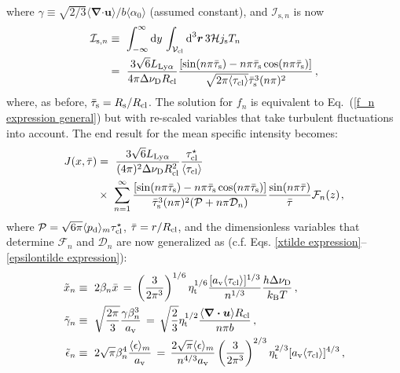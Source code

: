 \documentclass[fleqn,usenatbib]{mnras}
\newcommand{\taucl}{\tau_{\rm cl}}
\begin{document}
where $\gamma \equiv \sqrt{2/3} \langle \boldsymbol{\nabla} \boldsymbol{\cdot} \boldsymbol{u} \rangle/b\langle \alpha_0 \rangle$  (assumed constant), and $\mathcal{I}_{\textrm{s},n}$ is now
\begin{align}
    \mathcal{I}_{\textrm{s}, n} &\equiv~ \int_{-\infty}^{\infty} \textrm{d}y \, \int_{\mathcal{V}_{\rm cl}} \textrm{d}^3 \boldsymbol{r} \, 3 \mathcal{H} j_{\rm s} T_n \nonumber \\
    &=~ \dfrac{3\sqrt{6} L_{\rm Ly\alpha} }{4 \pi \Delta \nu_{\rm D} R_{\rm cl}} \dfrac{[\sin(n\pi \Bar{\tau}_{\rm s}) - n\pi \Bar{\tau}_{\rm s} \cos( n\pi \Bar{\tau}_{\rm s})]}{ \sqrt{2 \pi \langle \taucl \rangle} \Bar{\tau}_{\rm s}^3 (n \pi)^2} \, ,
\end{align}
where, as before, $\Bar{\tau}_{\rm s} = R_{\rm s}/R_{\rm cl}$. The solution for $f_n$ is equivalent to Eq.~(\ref{f_n expression general}) but with re-scaled variables that take turbulent fluctuations into account. The end result for the mean specific intensity becomes:
\begin{align}
    J(x, \Bar{\tau}) &=~ \dfrac{3 \sqrt{6} L_{\rm Ly\alpha}}{(4\pi)^2 \Delta\nu_{\rm D} R_{\rm cl}^2 } \dfrac{\taucl^\star}{\langle \taucl \rangle} \nonumber \\ &\times~ \sum_{n = 1}^{\infty} \dfrac{[\sin(n \pi \Bar{\tau}_{\rm s}) - n\pi \Bar{\tau}_{\rm s}\cos(n \pi \Bar{\tau}_{\rm s})]}{\Bar{\tau}_{\rm s}^3 (n\pi)^2 (\mathcal{P} + n \pi \mathcal{D}_n)} \dfrac{\sin(n \pi \Bar{\tau})}{\Bar{\tau}} \mathcal{F}_n(z) \hspace{1 pt} \label{series solution turbulent cloud},
\end{align}
where $\mathcal{P} = \sqrt{6 \pi} \langle p_{\rm d} \rangle_{ m} \taucl^{\star}$, $\Bar{\tau} = r/R_{\rm cl}$, and the dimensionless variables that determine $\mathcal{F}_n$ and $\mathcal{D}_n$ are now generalized as (c.f. Eqs. \ref{xtilde expression}--\ref{epsilontilde expression}):
\begin{align}
    \Tilde{x}_n &\equiv~ 2 \beta_n \Bar{x} \, = \, \left( \dfrac{3}{2 \pi^3} \right)^{1/6} \eta_{\rm t}^{1/6} \dfrac{[a_{\rm v} \langle \taucl \rangle]^{1/3}}{n^{1/3}} \dfrac{h \Delta\nu_{\rm D}}{k_{\rm B} T} \, ,  \\ \Tilde{\gamma}_n &\equiv~ \sqrt{\dfrac{2\pi}{3}} \dfrac{\gamma \beta_n^3}{a_{\rm v}} \, = \, \sqrt{\dfrac{2}{3}} \eta_{\rm t}^{1/2} \dfrac{\langle \boldsymbol{\nabla} \boldsymbol{\cdot} \boldsymbol{u} \rangle R_{\rm cl}}{n \pi b } \, , \\ \Tilde{\epsilon}_n &\equiv~ 2 \sqrt{\pi} \beta_n^4 \dfrac{\langle \epsilon \rangle_{m}}{a_{\rm v}}  \, = \, \dfrac{2 \sqrt{\pi} \langle \epsilon \rangle_{ m}}{n^{4/3} a_{\rm v}} \left( \dfrac{3}{2 \pi^3} \right)^{2/3} \eta_{\rm t}^{2/3} [a_{\rm v} \langle \taucl \rangle]^{4/3}  \, ,
\end{align}
\end{document}
